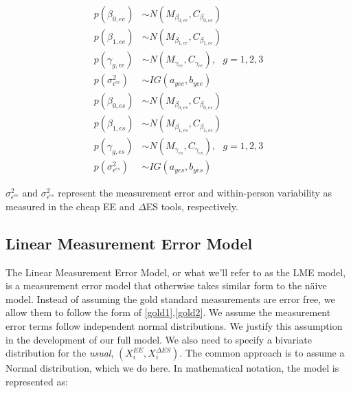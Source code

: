 \documentclass[11pt]{article}\usepackage[]{graphicx}\usepackage[]{color}
\begin{document}
\begin{multicols}{2}
\noindent 
\begin{align}
p(\beta_{0,ee}) &\sim N(M_{\beta_{0,ee}},C_{\beta_{0,ee}}) \\
p(\beta_{1,ee}) &\sim N(M_{\beta_{1,ee}},C_{\beta_{1,ee}}) \\
p(\gamma_{g,ee}) &\sim N(M_{\gamma_{ee}},C_{\gamma_{ee}}), \text{ } g=1,2,3 \\
p(\sigma^2_{\epsilon^{ee}}) &\sim IG(a_{yee},b_{yee}) 
\end{align}
\columnbreak
\begin{align}
p(\beta_{0,es}) &\sim N(M_{\beta_{0,es}},C_{\beta_{0,es}}) \\
p(\beta_{1,es}) &\sim N(M_{\beta_{1,es}},C_{\beta_{1,es}}) \\
p(\gamma_{g,es}) &\sim N(M_{\gamma_{es}},C_{\gamma_{es}}), \text{ } g=1,2,3 \\
p(\sigma^2_{\epsilon^{es}}) &\sim IG(a_{yes},b_{yes}) 
\end{align}
\end{multicols}

$\sigma^2_{\epsilon^{ee}}$ and $\sigma^2_{\epsilon^{es}}$ represent the measurement error and within-person variability as measured in the cheap EE and $\Delta$ES tools, respectively. 


\subsection{Linear Measurement Error Model}
The Linear Measurement Error Model, or what we'll refer to as the LME model, is a measurement error model that otherwise takes similar form to the n{\"a}ive model. Instead of assuming the gold standard measurements are error free, we allow them to follow the form of \eqref{gold1},\eqref{gold2}. We assume the measurement error terms follow independent normal distributions. We justify this assumption in the development of our full model. We also need to specify a bivariate distribution for the \emph{usual}, $(X_i^{EE},X_i^{\Delta ES})$. The common approach is to assume a Normal distribution, which we do here. In mathematical notation, the model is represented as:
\end{document}
